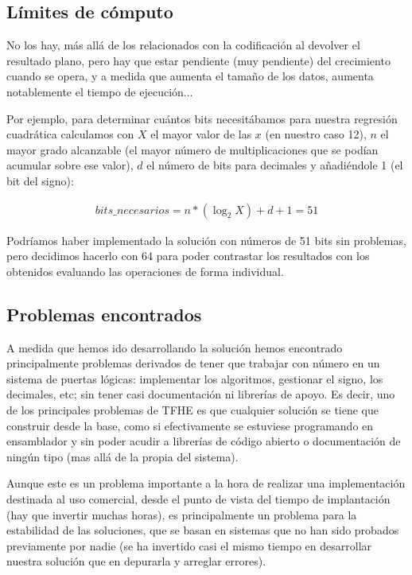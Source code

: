 \subsection{Límites de cómputo}

No los hay, más allá de los relacionados con la codificación al devolver el resultado plano, pero hay que estar pendiente (muy pendiente) del crecimiento cuando se opera, y a medida que aumenta el tamaño de los datos, aumenta notablemente el tiempo de ejecución...

Por ejemplo, para determinar cuántos bits necesitábamos para nuestra regresión cuadrática calculamos con $X$ el mayor valor de las $x$ (en nuestro caso 12), $n$ el mayor grado alcanzable (el mayor número de multiplicaciones que se podían acumular sobre ese valor), $d$ el número de bits para decimales y añadiéndole 1 (el bit del signo):

\begin{gather}
bits\_necesarios = n * (\log_2{X}) + d + 1 = 51
\end{gather}

Podríamos haber implementado la solución con números de 51 bits sin problemas, pero decidimos hacerlo con 64 para poder contrastar los resultados con los obtenidos evaluando las operaciones de forma individual.

\subsection{Problemas encontrados}

A medida que hemos ido desarrollando la solución hemos encontrado principalmente problemas derivados de tener que trabajar con número en un sistema de puertas lógicas: implementar los algoritmos, gestionar el signo, los decimales, etc; sin tener casi documentación ni librerías de apoyo. Es decir, uno de los principales problemas de TFHE es que cualquier solución se tiene que construir desde la base, como si efectivamente se estuviese programando en ensamblador y sin poder acudir a librerías de código abierto o documentación de ningún tipo (mas allá de la propia del sistema).

Aunque este es un problema importante a la hora de realizar una implementación destinada al uso comercial, desde el punto de vista del tiempo de implantación (hay que invertir muchas horas), es principalmente un problema para la estabilidad de las soluciones, que se basan en sistemas que no han sido probados previamente por nadie (se ha invertido casi el mismo tiempo en desarrollar nuestra solución que en depurarla y arreglar errores).

